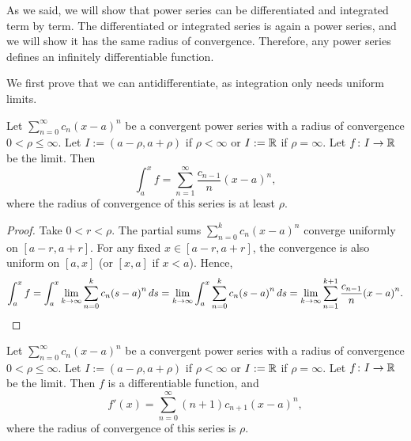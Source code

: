 As we said, we will show that
power series can be differentiated and integrated
term by term.  The 
differentiated or integrated series is again a power series,
and we will show it has the same radius of convergence.
Therefore, 
any power series defines an infinitely differentiable function.

We first prove that we can antidifferentiate, as integration only needs
uniform limits.

\begin{cor}
Let $\sum_{n=0}^\infty c_n {(x-a)}^n$ be a convergent power series with a radius
of convergence $0 < \rho \leq \infty$.
Let $I := (a-\rho,a+\rho)$ if $\rho < \infty$
or $I := {\mathbb{R}}$ if $\rho= \infty$.  Let $f \colon I \to {\mathbb{R}}$ be the limit.
Then
\begin{equation*}
\int_a^x f = \sum_{n=1}^\infty \frac{c_{n-1}}{n} {(x-a)}^{n} ,
\end{equation*}
where the radius of convergence of this series is at least $\rho$.
\end{cor}

\begin{proof}
Take $0 < r < \rho$.
The partial sums $\sum_{n=0}^k c_n {(x-a)}^n$ converge uniformly on $[a-r,a+r]$.
For any fixed $x \in [a-r,a+r]$, the convergence is also uniform
on $[a,x]$ (or $[x,a]$ if $x < a$).
Hence,
\begin{equation*}
\int_a^x f =
\int_a^x \lim_{k\to\infty} \sum_{n=0}^k c_n {(s-a)}^n \, ds
=
\lim_{k\to\infty}
\int_a^x \sum_{n=0}^k c_n {(s-a)}^n \, ds
=
\lim_{k\to\infty}
\sum_{n=1}^{k+1} \frac{c_{n-1}}{n} {(x-a)}^{n} . \qedhere
\end{equation*}
\end{proof}


\begin{cor} \label{cor:differentiatepowerser}
Let $\sum_{n=0}^\infty c_n {(x-a)}^n$ be a convergent power series with a radius
of convergence $0 < \rho \leq \infty$.
Let $I := (a-\rho,a+\rho)$ if $\rho < \infty$
or $I := {\mathbb{R}}$ if $\rho= \infty$.  Let $f \colon I \to {\mathbb{R}}$ be the limit.
Then $f$ is a differentiable function, and
\begin{equation*}
f'(x) = \sum_{n=0}^\infty (n+1) c_{n+1} {(x-a)}^{n} ,
\end{equation*}
where the radius of convergence of this series is $\rho$.
\end{cor}

